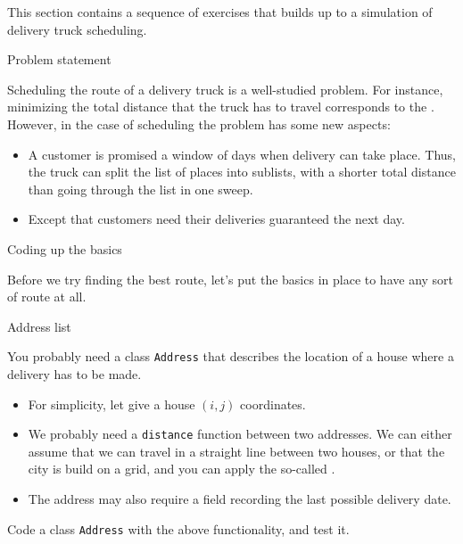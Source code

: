 
This section contains a sequence of exercises that builds up to a
simulation of delivery truck scheduling.

 {Problem statement}

Scheduling the route of a delivery truck is a well-studied
problem. For instance, minimizing the total distance that the truck
has to travel corresponds to the . However, in the
case of  scheduling the problem
has some new aspects:
\begin{itemize}
\item A customer is promised a window of days when delivery can take
  place. Thus, the truck can split the list of places into sublists,
  with a shorter total distance than going through the list in one
  sweep.
\item Except that  customers need their
  deliveries guaranteed the next day.
\end{itemize}

 {Coding up the basics}

Before we try finding the best route, let's put the basics in place
to have any sort of route at all.

 {Address list}

You probably need a class \lstinline{Address} that describes the
location of a house where a delivery has to be made.
\begin{itemize}
\item
  For simplicity, let give a house $(i,j)$ coordinates.
\item We probably need a \lstinline{distance} function between two
  addresses. We can either assume
  that we can travel in a straight line between two houses, or that
  the city is build on a grid, and you can apply the so-called
  .
\item The address may also require a field recording the last possible
  delivery date.
\end{itemize}

\begin{exercise}
  Code a class \lstinline{Address} with the above functionality, and
  test it.
\end{exercise}

